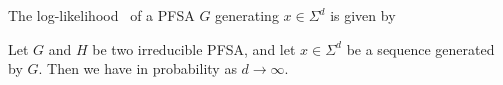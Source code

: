 \documentclass[9pt,journal,compsoc]{IEEEtran}
\begin{document}
{   \begin{defn}
     \label{defn:llk}
     The log-likelihood~\cite{cover2012elements} of a PFSA $G$ generating $x\in\Sigma^{d}$ is given by
%
   \end{defn}
   \begin{thm}
 	\label{thm:llkConvergence}
     Let $G$ and $H$ be two irreducible PFSA, and let $x\in\Sigma^d$ be a sequence generated by $G$. Then we have
     in probability as $d\rightarrow\infty$.
   \end{thm}
 
}
\end{document}
